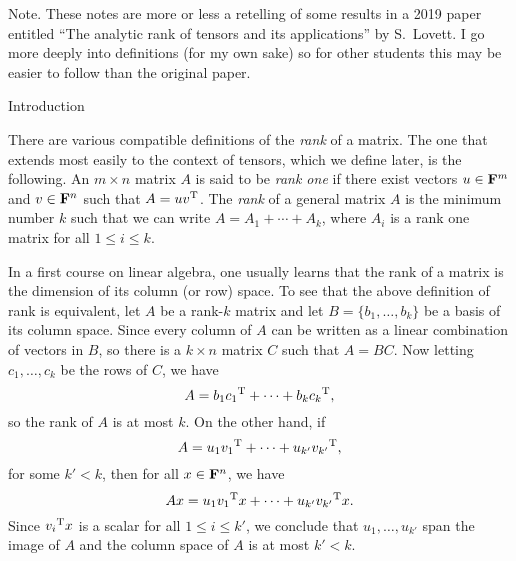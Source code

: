 


\def\FF{{\bf F}}
\def\T{{\rm T}}
\def\bias{\op{\rm bias}}
\def\prk{\op{\rm prk}}
\def\ark{\op{\rm ark}}
\def\bar{\overline}
\def\hat{\widehat}
\def\norm#1{|\!|#1|\!|}
\def\bignorm#1{\big|\!\big|#1\big|\!\big|}
\def\Norm#1{\Big|\!\Big|#1\Big|\!\Big|}
\def\normm#1{\bigg|\!\bigg|#1\bigg|\!\bigg|}
\def\x{{\bf x}}
\def\y{{\bf y}}

\widemargins
{}


 \ninebf Note. \ninepoint These notes are more or less a retelling of
some results in a 2019 paper entitled ``The analytic rank of tensors and its applications'' by
S.~Lovett. I go more deeply into definitions (for my own sake) so for other students this may be easier to
follow than the original paper.

\bigskip

\advsect Introduction

\noindent
There are various compatible definitions of the {\it rank} of a matrix. The one that
extends most easily to the context of tensors, which we define later, is the following.
An $m\times n$ matrix $A$ is said to be {\it rank one} if there exist vectors $u\in \FF^m$
and $v\in \FF^n$ such that $A = uv^\T$. The {\it rank} of a general matrix $A$ is the minimum
number $k$ such that we can write $A = A_1 + \cdots + A_k$, where $A_i$ is a rank one matrix
for all $1\le i\le k$.

In a first course on linear algebra, one usually learns that the rank of a matrix is the
dimension of its column (or row) space. To see that the above definition of rank is equivalent,
let $A$ be a rank-$k$ matrix and let $B = \{b_1, \ldots, b_k\}$
be a basis of its column space. Since every column of $A$
can be written as a linear combination of vectors in $B$, so there is a $k\times n$ matrix $C$
such that $A = BC$. Now letting $c_1, \ldots, c_k$ be the rows of $C$, we have
$$A = b_1{c_1}^\T + \cdots + b_k{c_k}^\T,$$
so the rank of $A$ is at most $k$. On the other hand, if
$$A = u_1{v_1}^\T + \cdots + u_{k'}{v_{k'}}^\T,$$
for some $k'< k$, then for all $x \in \FF^n$, we have
$$Ax = u_1{v_1}^\T x + \cdots + u_{k'}{v_{k'}}^\T x.$$
Since ${v_i}^\T x$ is a scalar for all $1\le i\le k'$, we conclude that $u_1, \ldots, u_{k'}$
span the image of $A$ and the column space of $A$ is at most $k'<k$.


